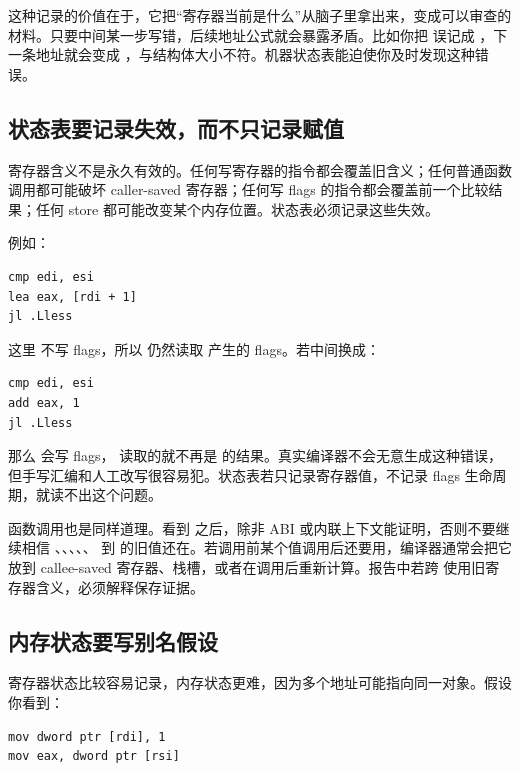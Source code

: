 这种记录的价值在于，它把“寄存器当前是什么”从脑子里拿出来，变成可以审查的材料。只要中间某一步写错，后续地址公式就会暴露矛盾。比如你把  误记成 ，下一条地址就会变成 ，与结构体大小不符。机器状态表能迫使你及时发现这种错误。

\subsection{状态表要记录失效，而不只记录赋值}

寄存器含义不是永久有效的。任何写寄存器的指令都会覆盖旧含义；任何普通函数调用都可能破坏 caller-saved 寄存器；任何写 flags 的指令都会覆盖前一个比较结果；任何 store 都可能改变某个内存位置。状态表必须记录这些失效。

例如：

\begin{lstlisting}
cmp edi, esi
lea eax, [rdi + 1]
jl .Lless
\end{lstlisting}

这里  不写 flags，所以  仍然读取  产生的 flags。若中间换成：

\begin{lstlisting}
cmp edi, esi
add eax, 1
jl .Lless
\end{lstlisting}

那么  会写 flags， 读取的就不再是  的结果。真实编译器不会无意生成这种错误，但手写汇编和人工改写很容易犯。状态表若只记录寄存器值，不记录 flags 生命周期，就读不出这个问题。

函数调用也是同样道理。看到  之后，除非 ABI 或内联上下文能证明，否则不要继续相信 、、、、、 到  的旧值还在。若调用前某个值调用后还要用，编译器通常会把它放到 callee-saved 寄存器、栈槽，或者在调用后重新计算。报告中若跨  使用旧寄存器含义，必须解释保存证据。

\subsection{内存状态要写别名假设}

寄存器状态比较容易记录，内存状态更难，因为多个地址可能指向同一对象。假设你看到：

\begin{lstlisting}
mov dword ptr [rdi], 1
mov eax, dword ptr [rsi]
\end{lstlisting}

